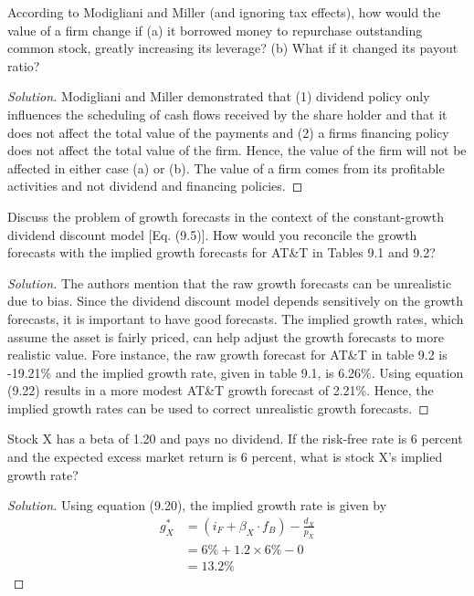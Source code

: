 \begin{problem}{9.1}
  According to Modigliani and Miller (and ignoring tax effects), how would the value of a firm change if (a) it borrowed money to repurchase outstanding common stock, greatly increasing its leverage? (b) What if it changed its payout ratio?
\end{problem}

\begin{proof}[Solution]
  Modigliani and Miller demonstrated that (1) dividend policy only influences the scheduling of cash flows received by the share holder and that it does not affect the total value of the payments and (2) a firms financing policy does not affect the total value of the firm. Hence, the value of the firm will not be affected in either case (a) or (b). The value of a firm comes from its profitable activities and not dividend and financing policies.
\end{proof}

\begin{problem}{9.2}
 Discuss the problem of growth forecasts in the context of the constant-growth dividend discount model [Eq. (9.5)]. How would you reconcile the growth forecasts with the implied growth forecasts for AT\&T in Tables 9.1 and 9.2?
\end{problem}

\begin{proof}[Solution]
 The authors mention that the raw growth forecasts can be unrealistic due to bias. Since the dividend discount model depends sensitively on the growth forecasts, it is important to have good forecasts. The implied growth rates, which assume the asset is fairly priced, can help adjust the growth forecasts to more realistic value. Fore instance, the raw growth forecast for AT\&T in table 9.2 is -19.21\% and the implied growth rate, given in table 9.1, is 6.26\%. Using equation (9.22) results in a more modest AT\&T growth forecast of 2.21\%. Hence, the implied growth rates can be used to correct unrealistic growth forecasts.
\end{proof}

\begin{problem}{9.3}
  Stock X has a beta of 1.20 and pays no dividend. If the risk-free rate is 6 percent and the expected excess market return is 6 percent, what is stock X's implied growth rate?
\end{problem}

\begin{proof}[Solution]
  Using equation (9.20), the implied growth rate is given by
  \begin{align*}
   g_{X}^{*}&=(i_{F}+\beta_X\cdot f_{B}) - \frac{d_{X}}{p_{X}}\\
	    &=6\% + 1.2\times 6\% - 0 \\
	    &=13.2\%
  \end{align*}
\end{proof}

